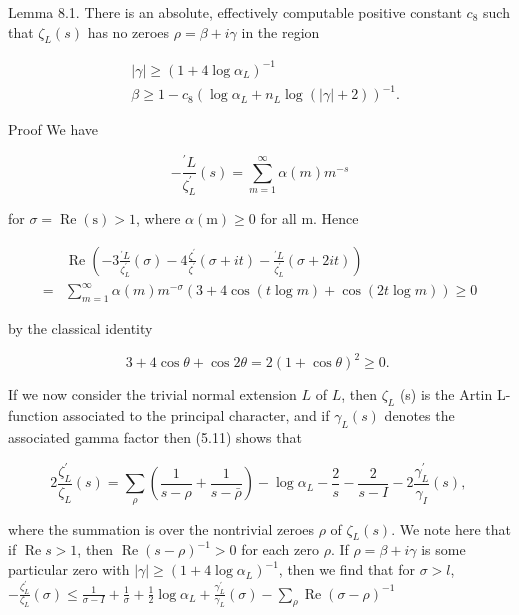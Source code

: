Lemma 8.1. There is an absolute, effectively computable positive constant $c_{8}$ such that $\zeta_{L}(s)$ has no zeroes $\rho=\beta+i \gamma$ in the region

$$
\begin{aligned}
&|\gamma| \geqslant\left(1+4 \log \alpha_{L}\right)^{-1} \\
&\beta \geqslant 1-c_{8}\left(\log \alpha_{L}+n_{L} \log (|\gamma|+2)\right)^{-1} .
\end{aligned}
$$

Proof We have

$$
-\frac{{ }^{\prime} L}{\zeta_{L}^{\prime}}(s)=\sum_{m=1}^{\infty} \alpha(m) m^{-s}
$$

for $\sigma=\operatorname{Re}(\mathrm{s})>1$, where $\alpha(\mathrm{m}) \geqslant 0$ for all $\mathrm{m}$. Hence

$$
\begin{aligned}
& \operatorname{Re}\left(-3 \frac{{ }^{\prime} L}{\zeta_{L}^{\prime}}(\sigma)-4 \frac{\zeta^{\prime}}{\zeta^{\prime}}(\sigma+i t)-\frac{{ }^{\prime} L}{\zeta_{L}^{\prime}}(\sigma+2 i t)\right) \\
=& \sum_{m=1}^{\infty} \alpha(m) m^{-\sigma}(3+4 \cos (t \log m)+\cos (2 t \log m)) \geqslant 0
\end{aligned}
$$

by the classical identity

$$
3+4 \cos \theta+\cos 2 \theta=2(1+\cos \theta)^{2} \geqslant 0 \text {. }
$$

If we now consider the trivial normal extension $L$ of $L$, then $\zeta_{L}$ (s) is the Artin L-function associated to the principal character, and if $\gamma_{L}(s)$ denotes the associated gamma factor then (5.11) shows that

$$
2 \frac{\zeta_{L}^{\prime}}{\zeta_{L}}(s)=\sum_{\rho}\left(\frac{1}{s-\rho}+\frac{1}{s-\bar{\rho}}\right)-\log \alpha_{L}-\frac{2}{s}-\frac{2}{s-I}-2 \frac{\gamma_{L}^{\prime}}{\gamma_{I}}(s) \text {, }
$$

where the summation is over the nontrivial zeroes $\rho$ of $\zeta_{L}(s)$. We note here that if $\operatorname{Re} s>1$, then $\operatorname{Re}(s-\rho)^{-1}>0$ for each zero $\rho$. If $\rho=\beta+i \gamma$ is some particular zero with $|\gamma| \geqslant\left(1+4 \log \alpha_{L}\right)^{-1}$, then we find that for $\sigma>l$, $-\frac{\zeta_{L}^{\prime}}{\zeta_{L}}(\sigma) \leqslant \frac{1}{\sigma-I}+\frac{1}{\sigma}+\frac{1}{2} \log \alpha_{L}+\frac{\gamma_{L}^{\prime}}{\gamma_{L}}(\sigma)-\sum_{\rho} \operatorname{Re}(\sigma-\rho)^{-1}$

